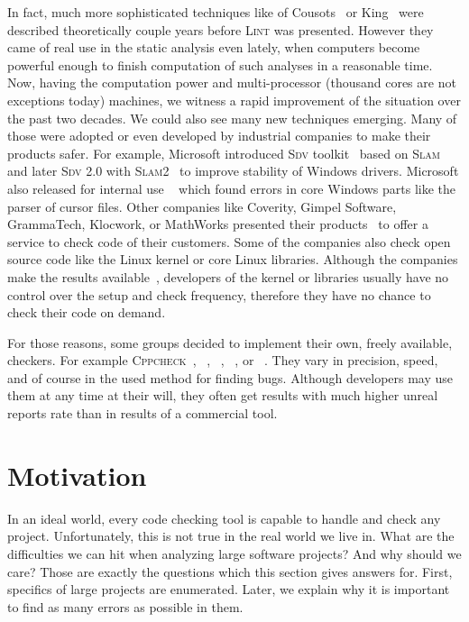 In fact, much more sophisticated techniques like of Cousots~\cite{cousot} or
King~\cite{se_king} were described theoretically couple years before
\textsc{Lint} was presented.  However they came of real use in the static
analysis even lately, when computers become powerful enough to finish
computation of such analyses in a reasonable time.  Now, having the computation
power and multi-processor (thousand cores are not exceptions today) machines,
we witness a rapid improvement of the situation over the past two decades. We
could also see many new techniques emerging. Many of those were adopted or
even developed by industrial companies to make their products safer. For
example, Microsoft introduced \textsc{Sdv} toolkit~\cite{sdv} based on
\textsc{Slam}~\cite{slam_cav, slam_popl, slam_decade} and later \textsc{Sdv}
2.0 with \textsc{Slam2}~\cite{slam2} to improve stability of Windows
drivers.  Microsoft also released for internal use \sage~\cite{sage} which
found errors in core Windows parts like the parser of cursor files. Other
companies like Coverity, Gimpel Software, GrammaTech, Klocwork, or MathWorks
presented their products~\cite{coverity, pclint, codesonar, klocwork,
polyspace} to offer a service to check code of their customers. Some of the
companies also check open source code like the Linux kernel or core Linux
libraries. Although the companies make the results
available~\cite{coverity_scan}, developers of the kernel or libraries usually
have no control over the setup and check frequency, therefore they have no
chance to check their code on demand.

For those reasons, some groups decided to implement their own, freely
available, checkers. For example \textsc{Cppcheck}~\cite{cppcheck},
\fbugs~\cite{findbugs}, \smatch~\cite{smatch}, \sparse~\cite{sparse}, or
\stan~\cite{stanse}.  They vary in precision, speed, and of course in the used
method for finding bugs.  Although developers may use them at any time at
their will, they often get results with much higher unreal reports rate than
in results of a commercial tool.

\section{Motivation}
In an ideal world, every code checking tool is capable to handle and check any
project. Unfortunately, this is not true in the real world we live in. What
are the difficulties we can hit when analyzing large software projects? And
why should we care? Those are exactly the questions which this section gives
answers for. First, specifics of large projects are enumerated. Later, we
explain why it is important to find as many errors as possible in them.

